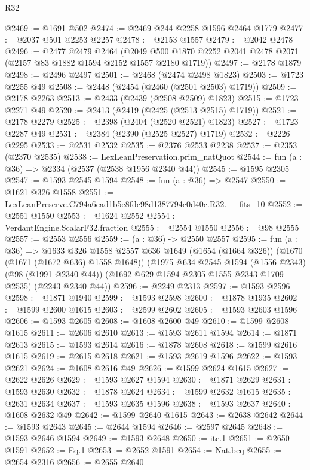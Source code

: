 \begin{lexlean}{R32}
\begin{coremodule}
@2469 := @1691 @502
@2474 := @2469 @244 @2258 @1596 @2464 @1779
@2477 := @2037 @501 @2253 @2257
@2478 := @2153 @1557
@2479 := @2042 @2478
@2496 := @2477
    @2479
    @2464
    (@2049 @500 @1870 @2252 @2041 @2478 @2071 (@2157 @83 @1882 @1594 @2152 @1557 @2180 @1719))
@2497 := @2178 @1879
@2498 := @2496 @2497
@2501 := @2468 (@2474 @2498 @1823)
@2503 := @1723 @2255 @49
@2508 := @2448 (@2454 (@2460 (@2501 @2503) @1719))
@2509 := @2178 @2263
@2513 := @2433 (@2439 (@2508 @2509) @1823)
@2515 := @1723 @2271 @49
@2520 := @2413 (@2419 (@2425 (@2513 @2515) @1719))
@2521 := @2178 @2279
@2525 := @2398 (@2404 (@2520 @2521) @1823)
@2527 := @1723 @2287 @49
@2531 := @2384 (@2390 (@2525 @2527) @1719)
@2532 := @2226 @2295
@2533 := @2531 @2532
@2535 := @2376 @2533 @2238
@2537 := @2353 (@2370 @2535)
@2538 := LexLeanPreservation.prim_natQuot
@2544 := fun (a : @36) => @2334 (@2537 (@2538 @1956 @2340 @44))
@2545 := @1595 @2305
@2547 := @1593 @2545 @1594
@2548 := fun (a : @36) => @2547
@2550 := @1621 @326 @1558
@2551 := LexLeanPreserve.C794a6cad1b5e8fdc98d1387794c0d40c.R32.__fits_10
@2552 := @2551 @1550
@2553 := @1624 @2552
@2554 := VerdantEngine.ScalarF32.fraction
@2555 := @2554 @1550
@2556 := @98 @2555
@2557 := @2553 @2556
@2559 := (a : @36) -> @2550 @2557
@2595 := fun (a : @36) =>
  @1633
    @326
    @1558
    @2557
    @636
    @1649
    (@1654 (@1664 @326))
    (@1670 (@1671 (@1672 @636) @1558 @1648))
    (@1975
      @634
      @2545
      @1594
      (@1556 @2343)
      (@98 (@1991 @2340 @44))
      (@1692 @629 @1594 @2305 @1555 @2343 @1709 @2535)
      (@2243 @2340 @44))
@2596 := @2249 @2313
@2597 := @1593 @2596
@2598 := @1871 @1940
@2599 := @1593 @2598
@2600 := @1878 @1935
@2602 := @1599 @2600 @1615
@2603 := @2599 @2602
@2605 := @1593 @2603 @1596
@2606 := @1593 @2605
@2608 := @1608 @2600 @49
@2610 := @1599 @2608 @1615
@2611 := @2606 @2610
@2613 := @1593 @2611 @1594
@2614 := @1871 @2613
@2615 := @1593 @2614
@2616 := @1878 @2608
@2618 := @1599 @2616 @1615
@2619 := @2615 @2618
@2621 := @1593 @2619 @1596
@2622 := @1593 @2621
@2624 := @1608 @2616 @49
@2626 := @1599 @2624 @1615
@2627 := @2622 @2626
@2629 := @1593 @2627 @1594
@2630 := @1871 @2629
@2631 := @1593 @2630
@2632 := @1878 @2624
@2634 := @1599 @2632 @1615
@2635 := @2631 @2634
@2637 := @1593 @2635 @1596
@2638 := @1593 @2637
@2640 := @1608 @2632 @49
@2642 := @1599 @2640 @1615
@2643 := @2638 @2642
@2644 := @1593 @2643
@2645 := @2644 @1594
@2646 := @2597 @2645
@2648 := @1593 @2646 @1594
@2649 := @1593 @2648
@2650 := ite.{1}
@2651 := @2650 @1591
@2652 := Eq.{1}
@2653 := @2652 @1591
@2654 := Nat.beq
@2655 := @2654 @2316
@2656 := @2655 @2640

\end{coremodule}
\end{lexlean}
